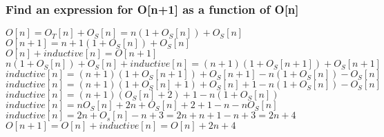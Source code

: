 \documentclass[11pt]{article}
\begin{document}
\subsubsection{Find an expression for O[n+1] as a function of O[n]}
\begin{center}
$
O[n] = O_T[n] + O_S[n] =n(1+O_S[n]) + O_S[n]
$
\\ \vspace{2mm}
$
O[n+1] = n+1(1+O_S[n]) + O_S[n]
$
\\ \vspace{2mm}
$
O[n] + inductive[n] = O[n+1]
$
\\ \vspace{2mm}
$
n(1+O_S[n]) + O_S[n] + inductive[n] =  (n+1)(1+O_S[n + 1]) + O_S[n + 1] 
$
\\ \vspace{2mm}
$
inductive[n] =  (n+1)(1+O_S[n + 1]) + O_S[n + 1]  - n(1+O_S[n]) - O_S[n]
$
\\ \vspace{2mm}
$
inductive[n] =  (n+1)(1+O_S[n] + 1) + O_S[n] + 1  - n(1+O_S[n]) - O_S[n]
$
\\ \vspace{2mm}
$
inductive[n] =  (n+1)(O_S[n] + 2) + 1  - n(1+O_S[n])
$
\\ \vspace{2mm}
$
inductive[n] =  nO_S[n] + 2n + O_S[n] + 2 + 1 - n - nO_S[n]
$
\\ \vspace{2mm}
$
inductive[n] =  2n + O_s[n] - n + 3 = 2n + n + 1 - n + 3 = 2n + 4
$
\\ \vspace{4mm}
$
O[n+1] = O[n] + inductive[n] = O[n] + 2n + 4
$

\end{center}



\end{document}
